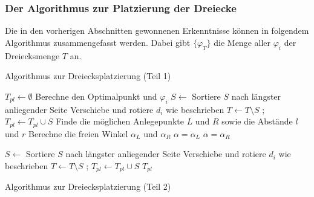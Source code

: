 \documentclass[a4paper, notitlepage, 12pt,headinclude]{scrartcl}
\begin{document}
  \subsubsection{Der Algorithmus zur Platzierung der Dreiecke}
  Die in den vorherigen Abschnitten gewonnenen Erkenntnisse können in folgendem Algorithmus zusammengefasst werden. Dabei gibt $\{\varphi_T\}$ die Menge aller $\varphi_i$ der Dreiecksmenge $T$ an.
  \begin{algorithm}[H]
  	\caption{Algorithmus zur Dreiecksplatzierung (Teil 1)}
  	\begin{algorithmic}
  		\State $T_{pl} \gets \emptyset$
  		\State Berechne den Optimalpunkt und $\varphi_i$
  		\EndFor
  		\State $S \gets$ 
  		\State Sortiere $S$ nach längster anliegender Seite
  		\State Verschiebe und rotiere $d_i$ wie beschrieben
  		\EndFor
  		\State $T \gets T\setminus S$ ; $T_{pl} \gets T_{pl} \cup S$
  		\State Finde die möglichen Anlegepunkte $L$ und $R$ sowie die Abstände $l$ und $r$
  		\State Berechne die freien Winkel $\alpha_L$ und $\alpha_R$
  		\State $\alpha = \alpha_L$
  		\Else
  		\State $\alpha = \alpha_R$
  		\EndIf
  	\end{algorithmic}
\end{algorithm}
\begin{algorithm}[H]
	\ContinuedFloat
	\begin{algorithmic}
  		\State $S \gets$ 
  		\State Sortiere $S$ nach längster anliegender Seite
  		\State Verschiebe und rotiere $d_i$ wie beschrieben
  		\EndFor
  		\State $T \gets T\setminus S$ ; $T_{pl} \gets T_{pl} \cup S$
  		\EndWhile
  		\State \Return $T_{pl}$
  		\EndFunction
  	\end{algorithmic}
  	\caption{Algorithmus zur Dreiecksplatzierung (Teil 2)}
  \end{algorithm}
\end{document}
